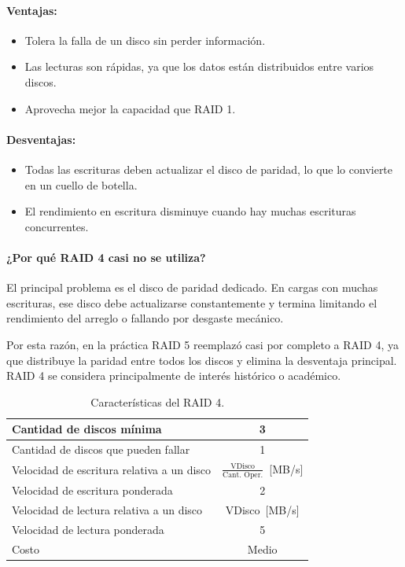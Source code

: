 \paragraph{Ventajas:}
\begin{itemize}
  \item Tolera la falla de un disco sin perder información.
  \item Las lecturas son rápidas, ya que los datos están distribuidos entre varios discos.
  \item Aprovecha mejor la capacidad que RAID 1.
\end{itemize}

\paragraph{Desventajas:}
\begin{itemize}
  \item Todas las escrituras deben actualizar el disco de paridad, lo que lo convierte en un cuello de botella.
  \item El rendimiento en escritura disminuye cuando hay muchas escrituras concurrentes.
\end{itemize}

\paragraph{¿Por qué RAID 4 casi no se utiliza?}

El principal problema es el disco de paridad dedicado. En cargas con muchas escrituras, ese disco debe actualizarse constantemente y termina limitando el rendimiento del arreglo o fallando por desgaste mecánico.

Por esta razón, en la práctica RAID 5 reemplazó casi por completo a RAID 4, ya que distribuye la paridad entre todos los discos y elimina la desventaja principal. RAID 4 se considera principalmente de interés histórico o académico.

\begin{table}[!ht]
  \centering
  \begin{tabular}{l|c}
    Cantidad de discos mínima & 3 \\\hline
    Cantidad de discos que pueden fallar & 1 \\ \hline
    Velocidad de escritura relativa a un disco & \(\frac{\text{VDisco}}{\text{Cant. Oper.}}\)~[MB/s] \\\hline
    Velocidad de escritura ponderada & 2 \\ \hline
    Velocidad de lectura relativa a un disco & VDisco~[MB/s] \\ \hline
    Velocidad de lectura ponderada & 5 \\ \hline
    Costo & Medio
  \end{tabular}
  \caption{Características del RAID 4.}
\end{table}

